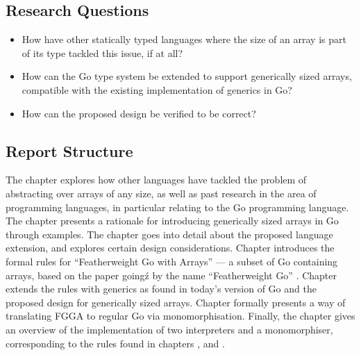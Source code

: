\subsection{Research Questions}

\begin{itemize}
      \item How have other statically typed languages where the size of an array
            is part of its type tackled this issue, if at all?
      \item How can the Go type system be extended to support generically sized
            arrays, compatible with the existing implementation of generics in
            Go?
      \item How can the proposed design be verified to be correct?
\end{itemize}


\subsection{Report Structure}

The  chapter explores how
other languages have tackled the problem of abstracting over arrays of any size,
as well as past research in the area of programming languages, in particular
relating to the Go programming language. The
 chapter presents a rationale for
introducing generically sized arrays in Go through examples. The
 chapter goes into detail about the
proposed language extension, and explores certain design considerations. Chapter
 introduces the formal rules for ``Featherweight
Go with Arrays'' --- a subset of Go containing arrays, based on the paper goingź
by the name ``Featherweight Go'' \autocite{fg}. Chapter
 extends the rules with generics as found in
today's version of Go and the proposed design for generically sized arrays.
Chapter  formally presents a way of
translating FGGA to regular Go via monomorphisation. Finally, the
 chapter gives an overview of
the implementation of two interpreters and a monomorphiser, corresponding
to the rules found in chapters ,
 and .
